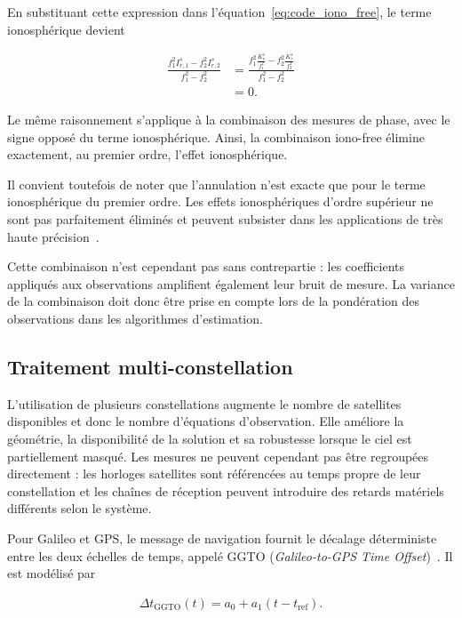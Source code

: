 En substituant cette expression dans l'équation~\eqref{eq:code_iono_free},
le terme ionosphérique devient

\begin{align}
\frac{
f_1^2I_{r,1}^s-f_2^2I_{r,2}^s
}{
f_1^2-f_2^2
}
&=
\frac{
f_1^2\frac{K_r^s}{f_1^2}
-
f_2^2\frac{K_r^s}{f_2^2}
}{
f_1^2-f_2^2
}
\\
&=
0.
\end{align}

Le même raisonnement s'applique à la combinaison des mesures de phase,
avec le signe opposé du terme ionosphérique. Ainsi, la combinaison
iono-free élimine exactement, au premier ordre, l'effet
ionosphérique.

Il convient toutefois de noter que l'annulation n'est exacte que pour le
terme ionosphérique du premier ordre. Les effets ionosphériques d'ordre
supérieur ne sont pas parfaitement éliminés et peuvent subsister dans les
applications de très haute précision~\cite{bassiriHajj1993}.

Cette combinaison n'est cependant pas sans contrepartie : les coefficients appliqués aux observations amplifient également leur bruit de mesure. La variance de la combinaison doit donc être prise en compte lors de la pondération des observations dans les algorithmes d'estimation.

\subsection{Traitement multi-constellation}

L'utilisation de plusieurs constellations augmente le nombre de satellites
disponibles et donc le nombre d'équations d'observation. Elle améliore la
géométrie, la disponibilité de la solution et sa robustesse lorsque le ciel est
partiellement masqué. Les mesures ne peuvent cependant pas être regroupées
directement : les horloges satellites sont référencées au temps propre de leur
constellation et les chaînes de réception peuvent introduire des retards
matériels différents selon le système.

Pour Galileo et GPS, le message de navigation fournit le décalage déterministe
entre les deux échelles de temps, appelé GGTO (\textit{Galileo-to-GPS Time
Offset})~\cite{galileoOsSisIcd21}. Il est modélisé par

\begin{align}
\Delta t_{\mathrm{GGTO}}(t)
=
a_0+a_1\left(t-t_{\mathrm{ref}}\right).
\label{eq:ggto}
\end{align}

